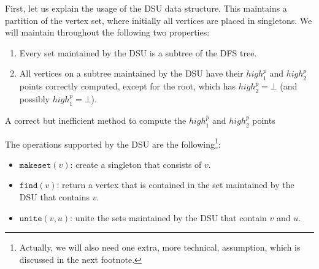 \documentclass[11pt,a4paper]{article}
\begin{document}
First, let us explain the usage of the DSU data structure. This maintains a partition of the vertex set, where initially all vertices are placed in singletons. We will maintain throughout the following two properties:

\begin{enumerate}[label={(\arabic*)}]
\item{Every set maintained by the DSU is a subtree of the DFS tree.}
\item{All vertices on a subtree maintained by the DSU have their $\mathit{high}^p_1$ and $\mathit{high}^p_2$ points correctly computed, except for the root, which has $\mathit{high}^p_2=\bot$ (and possibly $\mathit{high}^p_1=\bot$).}
\end{enumerate}

\begin{algorithm}[h!]
\caption{\textsf{A correct but inefficient method to compute the $\mathit{high}^p_1$ and $\mathit{high}^p_2$ points}}
\label{algorithm:high_naive}
\LinesNumbered
\DontPrintSemicolon


\end{algorithm}

The operations supported by the DSU are the following\footnote{Actually, we will also need one extra, more technical, assumption, which is discussed in the next footnote.}:

\begin{itemize}
\item{$\mathtt{makeset}(v)$: create a singleton that consists of $v$.}
\item{$\mathtt{find}(v)$: return a vertex that is contained in the set maintained by the DSU that contains $v$.}
\item{$\mathtt{unite}(v,u)$: unite the sets maintained by the DSU that contain $v$ and $u$.}
\end{itemize}
\end{document}
